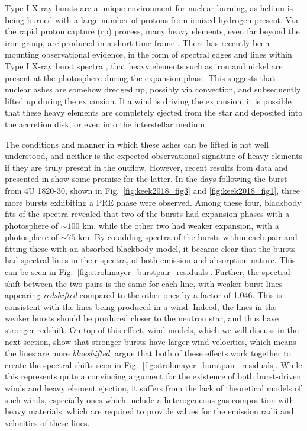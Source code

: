 \documentclass[../main.tex]{subfiles}
\begin{document}
Type I X-ray bursts are a unique environment for nuclear burning, as helium is being burned with a large number of protons from ionized hydrogen present. Via the rapid proton capture (rp) process, many heavy elements, even  far beyond the iron group, are produced in a short time frame \citep{Schatz1999}. There has recently been mounting observational evidence, in the form of spectral edges and lines within Type I X-ray burst spectra \citep{IntZand2010,Kajava2017,Strohmayer2019}, that heavy elements such as iron and nickel are present at the photosphere during the expansion phase. This suggests that nuclear ashes are somehow dredged up, possibly via convection, and subsequently lifted up during the expansion. If a wind is driving the expansion, it is possible that these heavy elements are completely ejected from the star and deposited into the accretion disk, or even into the interstellar medium.  

The conditions and manner in which these ashes can be lifted is not well understood, and neither is the expected observational signature of heavy elements if they are truly present in the outflow. However, recent results from \Nicer {} data and presented in \citet{Strohmayer2019} show some promise for the latter. In the days following the burst from 4U 1820-30, shown in Fig.~\ref{fig:keek2018_fig3} and \ref{fig:keek2018_fig1}, three more bursts exhibiting a PRE phase were observed. Among these four, blackbody fits of the spectra revealed that two of the bursts had expansion phases with a photosphere of ${\sim}100$ km, while the other two had weaker expansion, with a photosphere of ${\sim}75$ km. By co-adding spectra of the bursts within each pair and fitting these with an absorbed blackbody model, it became clear that the bursts had spectral lines in their spectra, of both emission and absorption nature. This can be seen in Fig.~\ref{fig:strohmayer_burstpair_residuals}. Further, the spectral shift between the two pairs is the same for each line, with weaker burst lines appearing \textit{redshifted} compared to the other ones by a factor of 1.046. This is consistent with the lines being produced in a wind. Indeed, the lines in the weaker bursts should be produced closer to the neutron star, and thus have stronger redshift. On top of this effect, wind models, which we will discuss in the next section, show that stronger bursts have larger wind velocities, which means the lines are more \textit{blueshifted}. \citet{Strohmayer2019} argue that both of these effects work together to create the spectral shifts seen in Fig.~\ref{fig:strohmayer_burstpair_residuals}. While this represents quite a convincing argument for the existence of both burst-driven winds and heavy element ejection, it suffers from the lack of theoretical models of such winds, especially ones which include a heterogeneous gas composition with heavy materials, which are required to provide values for the emission radii and velocities of these lines. \\
\end{document}
